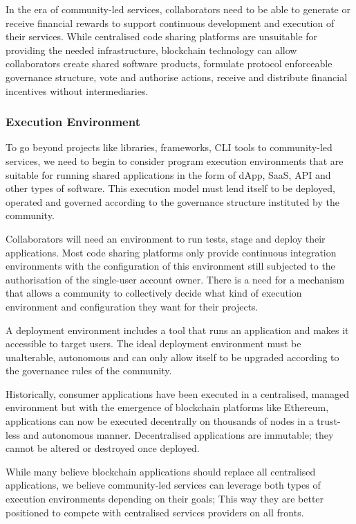 In the era of community-led services, collaborators need to be able to generate or receive financial rewards to support continuous development and execution of their services. While centralised code sharing platforms are unsuitable for providing the needed infrastructure, blockchain technology can allow collaborators create shared software products, formulate protocol enforceable governance structure, vote and authorise actions, receive and distribute financial incentives without intermediaries.


\subsubsection{Execution Environment}
To go beyond projects like libraries, frameworks, CLI tools to community-led services, we need to begin to consider program execution environments that are suitable for running shared applications in the form of dApp, SaaS, API and other types of software. This execution model must lend itself to be deployed, operated and governed according to the governance structure instituted by the community.

Collaborators will need an environment to run tests, stage and deploy their applications. Most code sharing platforms only provide continuous integration environments with the configuration of this environment still subjected to the authorisation of the single-user account owner. There is a need for a mechanism that allows a community to collectively decide what kind of execution environment and configuration they want for their projects.

A deployment environment includes a tool that runs an application and makes it accessible to target users. The ideal deployment environment must be unalterable, autonomous and can only allow itself to be upgraded according to the governance rules of the community.

Historically, consumer applications have been executed in a centralised, managed environment but with the emergence of blockchain platforms like Ethereum, applications can now be executed decentrally on thousands of nodes in a trust-less and autonomous manner. Decentralised applications are immutable; they cannot be altered or destroyed once deployed.

While many believe blockchain applications should replace all centralised applications, we believe community-led services can leverage both types of execution environments depending on their goals; This way they are better positioned to compete with centralised services providers on all fronts.

